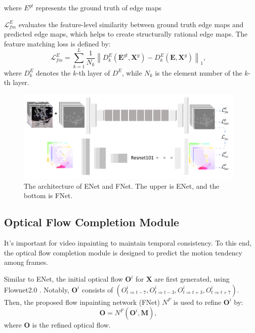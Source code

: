where $E^{gt}$ represents the ground truth of edge maps 

$\mathcal{L}^E_{fm}$ evaluates the feature-level similarity between ground truth edge maps and predicted edge maps, which helps to create structurally rational edge maps. The feature matching loss is defined by:
\begin{equation}
	\label{eq:edge_fm}
	\mathcal{L}^E_{fm}=\sum_{k=1}^L{\frac{1}{N_k}\left\| D^E_k(\boldsymbol{E}^{gt},\boldsymbol{X}^{g})- D^E_k(\boldsymbol{E},\boldsymbol{X}^{g})\right\|_1},
\end{equation}
where $D^E_k$ denotes the $k$-th layer of $D^E$, while $N_k$ is the element number of the $k$-th layer.
\begin{figure}[t]
	\centering
	\includegraphics[width=1.1\columnwidth]{enet} %
	\caption{The architecture of ENet and FNet. The upper is ENet, and the bottom is FNet. }
	\label{enet}
\end{figure}
\subsection{Optical Flow Completion Module}
It's important for video inpainting to maintain temporal consistency.
To this end, the optical flow completion module is designed to predict the motion tendency among frames.

Similar to ENet, the initial optical flow \(\boldsymbol{O}^i\) for $\boldsymbol{X}$ are first generated, using Flownet2.0 \cite{Flownet_2017_CVPR}.
Notably, \(\boldsymbol{O}^i\) consists of \((O^i_{t\Rightarrow t-7},O^i_{t\Rightarrow t-3},O^i_{t\Rightarrow t+3},O^i_{t\Rightarrow t+7})\).
Then, the proposed flow inpainting network (FNet) $N^F$ is used to refine \(\boldsymbol{O}^i\) by:
\begin{equation}
	\label{eq:flownet}
	\boldsymbol{O}=N^F(\boldsymbol{O}^{i},\boldsymbol{M}),
\end{equation}
where $\boldsymbol{O}$ is the refined optical flow.

